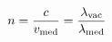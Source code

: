 \documentclass[preview]{standalone}
\begin{document}
\begin{align*}
\special{dvisvgm:raw <g id='unique000'>}n = \frac{c}{v_\text{med}} = \frac{\lambda_\text{vac}}{\lambda_\text{med}}\special{dvisvgm:raw </g>}
\end{align*}
\end{document}
